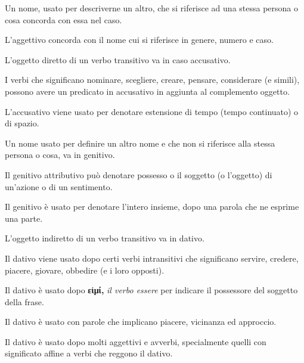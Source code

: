 \documentclass[nols]{tufte-handout}
\begin{document}
 Un nome, usato per descriverne un altro, che si 
riferisce ad una stessa persona o cosa concorda con essa nel caso.

 L'aggettivo concorda con il nome cui
si riferisce in genere, numero e caso.

 L'oggetto diretto di un verbo transitivo va in caso accusativo.

 I verbi che
significano nominare, scegliere, creare, pensare, considerare (e simili),
possono avere un predicato in accusativo in aggiunta al complemento oggetto.

 L'accusativo viene usato per denotare estensione di tempo (tempo continuato) o di spazio.

 Un nome usato per definire un altro nome e che non si riferisce alla stessa persona o cosa, va in genitivo.

 Il genitivo attributivo può denotare possesso o il soggetto (o l'oggetto) di un'azione o di un sentimento.

 Il genitivo è usato per denotare l'intero insieme, dopo una parola che ne esprime una parte.

 L'oggetto indiretto di un verbo transitivo va in dativo.

 Il dativo viene usato dopo certi verbi intransitivi che significano servire, credere, piacere, giovare, obbedire (e i loro opposti).

 Il dativo è usato dopo \textbf{εἰμί,} \textit{il verbo essere} per indicare il possessore del soggetto della frase.

 Il dativo è usato con parole che implicano piacere, vicinanza ed approccio.

 Il dativo è usato dopo molti aggettivi e avverbi, specialmente quelli con significato affine a verbi che reggono il dativo.

\end{document}
